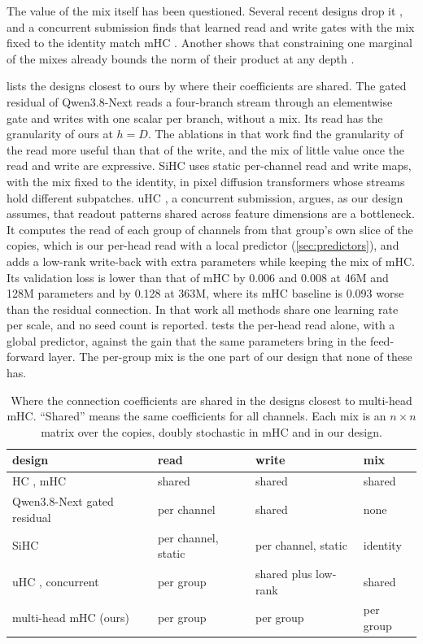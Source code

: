 \documentclass[11pt, a4paper]{article}
\begin{document}
The value of the mix itself has been questioned. Several recent designs drop it \citep{qiu2026qwen38next, ge2026chimera,
liang2026sihc}, and a concurrent submission finds that learned read and write gates with the mix fixed to the identity match mHC
\citep{anon2026simplehc}. Another shows that constraining one marginal of the mixes already bounds the norm of their product at
any depth \citep{anon2026oshc}.

 lists the designs closest to ours by where their coefficients are shared. The gated residual of Qwen3.8-Next
\citep{qiu2026qwen38next} reads a four-branch stream through an elementwise gate and writes with one scalar per branch, without a
mix. Its read has the granularity of ours at $h = D$. The ablations in that work find the granularity of the read more useful than
that of the write, and the mix of little value once the read and write are expressive. SiHC \citep{liang2026sihc} uses static
per-channel read and write maps, with the mix fixed to the identity, in pixel diffusion transformers whose streams hold different
subpatches. uHC \citep{anon2026uhc}, a concurrent submission, argues, as our design assumes, that readout patterns shared across
feature dimensions are a bottleneck. It computes the read of each group of channels from that group's own slice of the copies,
which is our per-head read with a local predictor (\cref{sec:predictors}), and adds a low-rank write-back with extra parameters while keeping the mix of
mHC. Its validation loss is lower than that of mHC by 0.006 and 0.008 at 46M and 128M parameters and by 0.128 at 363M, where its
mHC baseline is 0.093 worse than the residual connection. In that work all methods share one learning rate per scale, and no seed count is
reported.  tests the per-head read alone, with a global predictor, against the gain that the same
parameters bring in the feed-forward layer. The
per-group mix is the one part of our design that none of these has.

\begin{table}[ht]
  \centering
  \caption{Where the connection coefficients are shared in the designs closest to multi-head mHC. ``Shared'' means the
    same coefficients for all channels. Each mix is an $n \times n$ matrix over the copies, doubly stochastic in mHC and in our
    design.}
  \label{tab:related}
  \small
  \begin{tabular}{llll}
    \toprule
    design & read & write & mix \\
    \midrule
    HC \citep{zhu2024hyperconnections}, mHC \citep{xie2026mhc} & shared & shared & shared \\
    Qwen3.8-Next gated residual \citep{qiu2026qwen38next} & per channel & shared & none \\
    SiHC \citep{liang2026sihc} & per channel, static & per channel, static & identity \\
    uHC \citep{anon2026uhc}, concurrent & per group & shared plus low-rank & shared \\
    \midrule
    multi-head mHC (ours) & per group & per group & per group \\
    \bottomrule
  \end{tabular}
\end{table}
\end{document}
